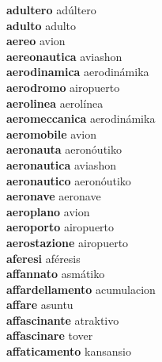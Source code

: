 \textbf{adultero } adúltero \\
\textbf{adulto } adulto \\
\textbf{aereo } avion \\
\textbf{aereonautica } aviashon \\
\textbf{aerodinamica } aerodinámika \\
\textbf{aerodromo } airopuerto \\
\textbf{aerolinea } aerolínea \\
\textbf{aeromeccanica } aerodinámika \\
\textbf{aeromobile } avion \\
\textbf{aeronauta } aeronóutiko \\
\textbf{aeronautica } aviashon \\
\textbf{aeronautico } aeronóutiko \\
\textbf{aeronave } aeronave \\
\textbf{aeroplano } avion \\
\textbf{aeroporto } airopuerto \\
\textbf{aerostazione } airopuerto \\
\textbf{aferesi } aféresis \\
\textbf{affannato } asmátiko \\
\textbf{affardellamento } acumulacion \\
\textbf{affare } asuntu \\
\textbf{affascinante } atraktivo \\
\textbf{affascinare } tover \\
\textbf{affaticamento } kansansio \\
